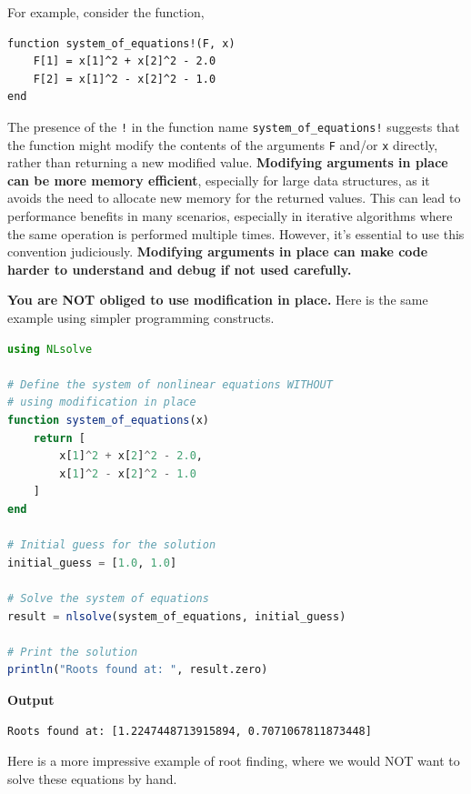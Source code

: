 For example, consider the function,
\begin{verbatim}
function system_of_equations!(F, x)
    F[1] = x[1]^2 + x[2]^2 - 2.0
    F[2] = x[1]^2 - x[2]^2 - 1.0
end
\end{verbatim}
The presence of the \texttt{!} in the function name \texttt{system\_of\_equations!} suggests that the function might modify the contents of the arguments \texttt{F} and/or \texttt{x} directly, rather than returning a new modified value.
\textbf{Modifying arguments in place can be more memory efficient}, especially for large data structures, as it avoids the need to allocate new memory for the returned values. This can lead to performance benefits in many scenarios, especially in iterative algorithms where the same operation is performed multiple times. However, it's essential to use this convention judiciously. \textbf{Modifying arguments in place can make code harder to understand and debug if not used carefully. } 

\bigskip
\textbf{You are NOT obliged to use modification in place.} Here is the same example using simpler programming constructs.
\bigskip

\begin{lstlisting}[language=Julia,style=mystyle]
using NLsolve

# Define the system of nonlinear equations WITHOUT
# using modification in place
function system_of_equations(x)
    return [
        x[1]^2 + x[2]^2 - 2.0,
        x[1]^2 - x[2]^2 - 1.0
    ]
end

# Initial guess for the solution
initial_guess = [1.0, 1.0]

# Solve the system of equations
result = nlsolve(system_of_equations, initial_guess)

# Print the solution
println("Roots found at: ", result.zero)
\end{lstlisting}
\textbf{Output} 
\begin{verbatim}
Roots found at: [1.2247448713915894, 0.7071067811873448]
\end{verbatim}

\bigskip
Here is a more impressive example of root finding, where we would NOT want to solve these equations by hand.
\bigskip

